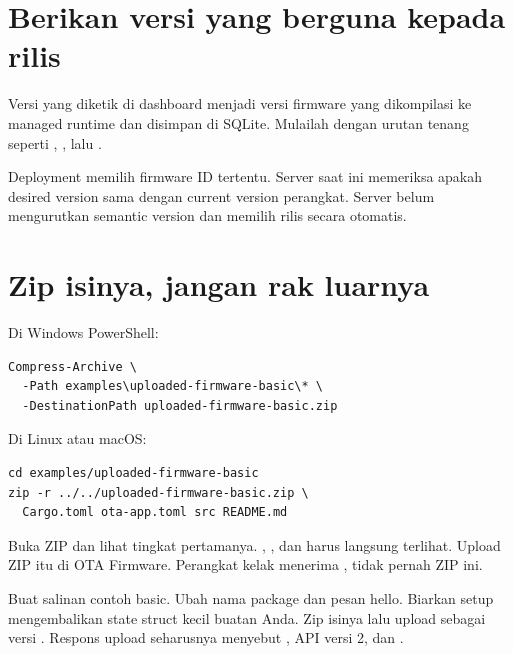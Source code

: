 \section{Berikan versi yang berguna kepada rilis}

Versi yang diketik di dashboard menjadi versi firmware yang dikompilasi ke managed runtime dan disimpan di SQLite. Mulailah dengan urutan tenang seperti , , lalu .

Deployment memilih firmware ID tertentu. Server saat ini memeriksa apakah desired version sama dengan current version perangkat. Server belum mengurutkan semantic version dan memilih rilis secara otomatis.

\section{Zip isinya, jangan rak luarnya}

Di Windows PowerShell:

\begin{lstlisting}
Compress-Archive \
  -Path examples\uploaded-firmware-basic\* \
  -DestinationPath uploaded-firmware-basic.zip
\end{lstlisting}

Di Linux atau macOS:

\begin{lstlisting}
cd examples/uploaded-firmware-basic
zip -r ../../uploaded-firmware-basic.zip \
  Cargo.toml ota-app.toml src README.md
\end{lstlisting}

Buka ZIP dan lihat tingkat pertamanya. , , dan  harus langsung terlihat. Upload ZIP itu di OTA Firmware. Perangkat kelak menerima , tidak pernah ZIP ini.

\begin{checkpoint}
Buat salinan contoh basic. Ubah nama package dan pesan hello. Biarkan setup mengembalikan state struct kecil buatan Anda. Zip isinya lalu upload sebagai versi \codepath{1.0.1}. Respons upload seharusnya menyebut , API versi 2, dan .
\end{checkpoint}
